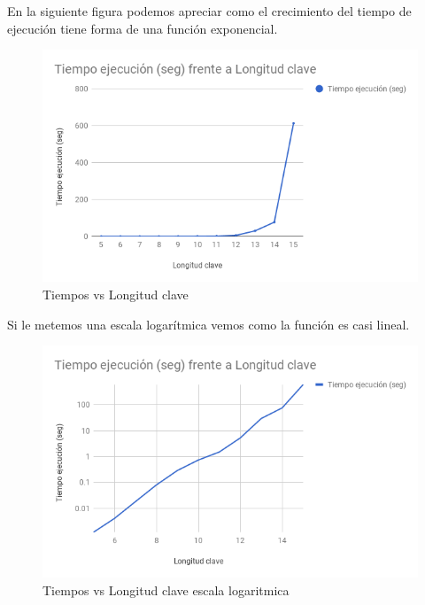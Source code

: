 En la siguiente figura podemos apreciar como el crecimiento del tiempo de ejecución tiene forma de una función exponencial.\\

\begin{figure}[H]
	\begin{center}
		\includegraphics[width=1\linewidth]{chart}
		\caption{Tiempos vs Longitud clave}
		\label{figura: tiempos}
	\end{center}
\end{figure}

Si le metemos una escala logarítmica vemos como la función es casi lineal.
\begin{figure}[H]
	\begin{center}
		\includegraphics[width=1\linewidth]{chart1}
		\caption{Tiempos vs Longitud clave escala logaritmica}
		\label{figura: tiempos2}
	\end{center}
\end{figure}



